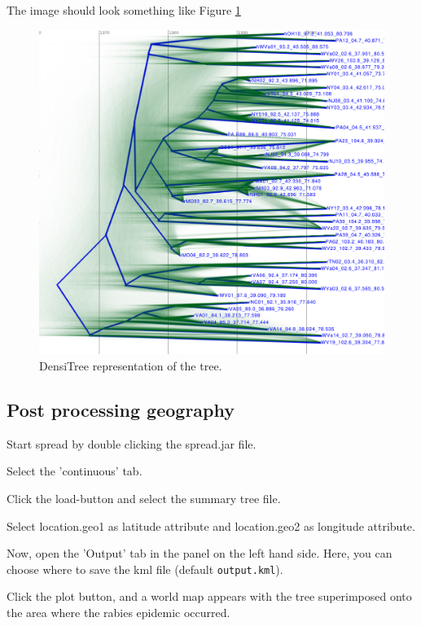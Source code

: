 \documentclass{article}
\begin{document}
The image should look something like Figure \ref{fig.DensiTree}

\begin{figure}
\begin{center}

\includegraphics[width=\textwidth]{figures/DensiTree}

\end{center}
\caption{\label{fig.DensiTree} DensiTree representation of the tree.}
\end{figure}

\subsection*{Post processing geography}

Start spread by double clicking the spread.jar file.

Select the 'continuous' tab.

Click the load-button and select the summary tree file.

Select location.geo1 as latitude attribute and location.geo2 as longitude attribute.

Now, open the 'Output' tab in the panel on the left hand side. Here, you can choose where to save the kml file (default {\tt output.kml}).

Click the plot button, and a world map appears with the tree superimposed onto the area where the rabies epidemic occurred.
\end{document}
